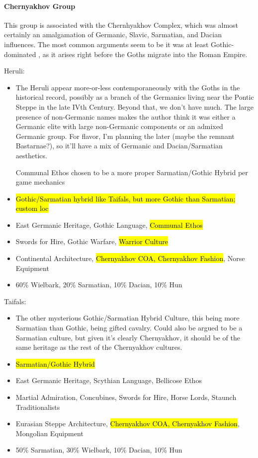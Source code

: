 \documentclass{article}
\begin{document}
	\paragraph{Chernyakhov Group}
	This group is associated with the Chernhyakhov Complex, which was almost certainly an amalgamation of Germanic, Slavic, Sarmatian, and Dacian influences.
	The most common arguments seem to be it was at least Gothic-dominated \cite{HeatherEmpiresAndBarbarians}, as it arises right before the Goths migrate into the Roman Empire.
	
	Heruli:
	\begin{itemize}
		\item The Heruli appear more-or-less contemporaneously with the Goths in the historical record, possibly as a branch of the Germanics living near the Pontic Steppe in the late IVth Century.
		Beyond that, we don’t have much.
		The large presence of non-Germanic names \cite{OdoacerGermanOrHun} makes the author think it was either a Germanic elite with large non-Germanic components or an admixed Germanic group.
		For flavor, I’m planning the later (maybe the remnant Bastarnae?), so it’ll have a mix of Germanic and Dacian/Sarmatian aesthetics.
		
		Communal Ethos chosen to be a more proper Sarmatian/Gothic Hybrid per game mechanics
		\item \hl{Gothic/Sarmatian hybrid like Taifals, but more Gothic than Sarmatian; custom loc}
		\item East Germanic Heritage, Gothic Language, \hl{Communal Ethos}
		\item Swords for Hire, Gothic Warfare, \hl{Warrior Culture}
		\item Continental Architecture, \hl{Chernyakhov COA, Chernyakhov Fashion}, Norse Equipment
		\item 60\% Wielbark, 20\% Sarmatian, 10\% Dacian, 10\% Hun
	\end{itemize}
	
	Taifals:
	\begin{itemize}
		\item The other mysterious Gothic/Sarmatian Hybrid Culture, this being more Sarmatian than Gothic, being gifted cavalry.
		Could also be argued to be a Sarmatian culture, but given it's clearly Chernyakhov, it should be of the same heritage as the rest of the Chernyakhov cultures.
		\item \hl{Sarmatian/Gothic Hybrid}
		\item East Germanic Heritage, Scythian Language, Bellicose Ethos
		\item Martial Admiration, Concubines, Swords for Hire, Horse Lords, Staunch Traditionalists
		\item Eurasian Steppe Architecture, \hl{Chernyakhov COA, Chernyakhov Fashion}, Mongolian Equipment
		\item 50\% Sarmatian, 30\% Wielbark, 10\% Dacian, 10\% Hun
	\end{itemize}
	
\end{document}
